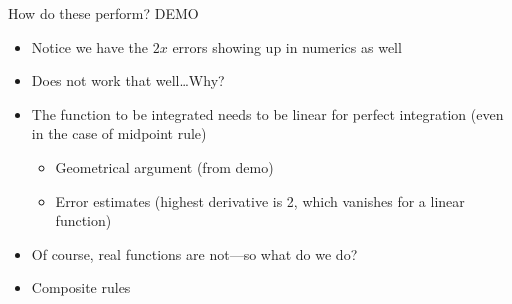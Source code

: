 \documentclass[presentation]{beamer}
\begin{document}
\begin{frame}[label={sec:org193a505}]{How do these perform?}
\alert{DEMO}
\begin{itemize}
\item Notice we have the \(2x\) errors showing up in numerics as well
\item Does not work that well\ldots{}Why?
\item The function to be integrated needs to be \alert{linear} for perfect integration
(even in the case of midpoint rule)
\begin{itemize}
\item Geometrical argument (from demo)
\item Error estimates (highest derivative is 2, which vanishes for a linear function)
\end{itemize}
\item Of course, real functions are not---so what do we do?
\item \alert{Composite rules}
\end{itemize}
\end{frame}
\end{document}
